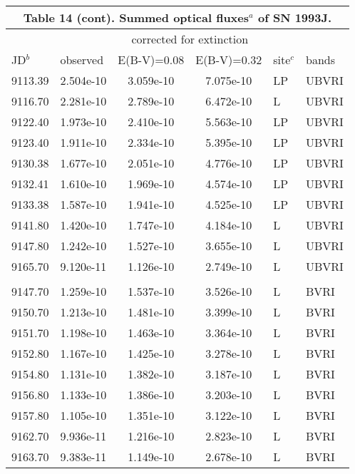 \begin{center}
\begin{tabular} {l l c c l l}
\multicolumn{6}{c}{Table 14 (cont). Summed optical fluxes$^a$ of SN 1993J.} \\ \hline \hline
 & & \multicolumn{2}{c}{corrected for extinction} & & \\
JD$^b$ & \hfil observed \hfil  & \hfil E(B-V)=0.08 \hfil   & \hfil E(B-V)=0.32 \hfil  & \hfil  site$^c$ \hfil  & \hfil  bands \hfil \\ \hline
   9113.39  &  2.504e-10  &  3.059e-10  &  7.075e-10 &  LP  &UBVRI  \\
   9116.70  &  2.281e-10  &  2.789e-10  &  6.472e-10 &  L &UBVRI  \\
   9122.40  &  1.973e-10  &  2.410e-10  &  5.563e-10 &  LP  &UBVRI  \\
   9123.40  &  1.911e-10  &  2.334e-10  &  5.395e-10 &  LP  &UBVRI  \\
   9130.38  &  1.677e-10  &  2.051e-10  &  4.776e-10 &  LP  &UBVRI  \\
   9132.41  &  1.610e-10  &  1.969e-10  &  4.574e-10 &  LP  &UBVRI  \\
   9133.38  &  1.587e-10  &  1.941e-10  &  4.525e-10 &  LP  &UBVRI  \\
   9141.80  &  1.420e-10  &  1.747e-10  &  4.184e-10 &  L &UBVRI  \\
   9147.80  &  1.242e-10  &  1.527e-10  &  3.655e-10 &  L &UBVRI  \\
   9165.70  &  9.120e-11  &  1.126e-10  &  2.749e-10 &  L &UBVRI  \\
 \\
   9147.70  &  1.259e-10  &  1.537e-10  &  3.526e-10 &  L & BVRI  \\
   9150.70  &  1.213e-10  &  1.481e-10  &  3.399e-10 &  L & BVRI  \\
   9151.70  &  1.198e-10  &  1.463e-10  &  3.364e-10 &  L & BVRI  \\
   9152.80  &  1.167e-10  &  1.425e-10  &  3.278e-10 &  L & BVRI  \\
   9154.80  &  1.131e-10  &  1.382e-10  &  3.187e-10 &  L & BVRI  \\
   9156.80  &  1.133e-10  &  1.386e-10  &  3.203e-10 &  L & BVRI  \\
   9157.80  &  1.105e-10  &  1.351e-10  &  3.122e-10 &  L & BVRI  \\
   9162.70  &  9.936e-11  &  1.216e-10  &  2.823e-10 &  L & BVRI  \\
   9163.70  &  9.383e-11  &  1.149e-10  &  2.678e-10 &  L & BVRI  \\

\end{tabular}
\end{center}
